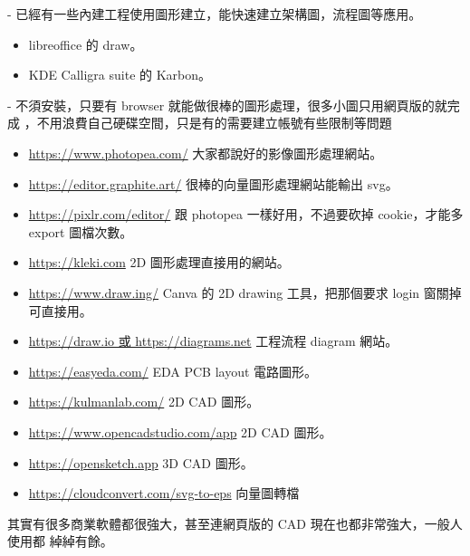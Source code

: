 \begin{description}
\begin{itemize}
    \end{itemize}
  \item [工程流程 diagram 圖] -
    已經有一些內建工程使用圖形建立，能快速建立架構圖，流程圖等應用。
    \begin{itemize}
      \item libreoffice 的 draw。
      \item KDE Calligra suite 的 Karbon。
    \end{itemize}
  \item [網頁版本] -
    不須安裝，只要有 browser 就能做很棒的圖形處理，很多小圖只用網頁版的就完成
    ，不用浪費自己硬碟空間，只是有的需要建立帳號有些限制等問題
    \begin{itemize}
      \item \href{https://www.photopea.com/}
        {https://www.photopea.com/}
        大家都說好的影像圖形處理網站。
      \item \href{https://editor.graphite.art/}
        {https://editor.graphite.art/}
        很棒的向量圖形處理網站能輸出 svg。
      \item \href{https://pixlr.com/editor}
        {https://pixlr.com/editor/}
        跟 photopea 一樣好用，不過要砍掉 cookie，才能多 export 圖檔次數。
      \item \href{https://kleki.com/}{https://kleki.com}
        2D 圖形處理直接用的網站。
      \item \href{https://www.draw.ing/}{https://www.draw.ing/}
        Canva 的 2D drawing 工具，把那個要求 login 窗關掉可直接用。
      \item \href{https://diagrams.net}{https://draw.io 或 https://diagrams.net}
        工程流程 diagram 網站。
      \item \href{https://easyeda.com/}{https://easyeda.com/}
        EDA PCB layout 電路圖形。
      \item \href{https://kulmanlab.com/}{https://kulmanlab.com/}
        2D CAD 圖形。
      \item \href{https://www.opencadstudio.com}
        {https://www.opencadstudio.com/app}
        2D CAD 圖形。
      \item \href{https://opensketch.app}{https://opensketch.app}
        3D CAD 圖形。
      \item \href{https://cloudconvert.com/svg-to-eps}
        {https://cloudconvert.com/svg-to-eps}
        向量圖轉檔
    \end{itemize}
\end{description}
其實有很多商業軟體都很強大，甚至連網頁版的 CAD 現在也都非常強大，一般人使用都
綽綽有餘。
